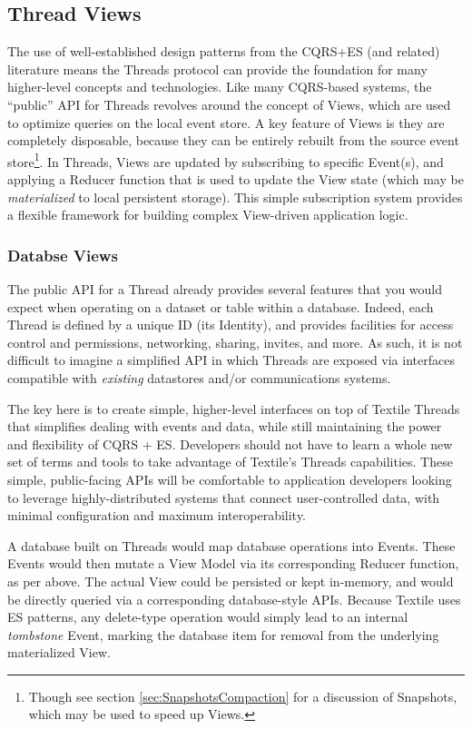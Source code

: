 \documentclass{textile}
\begin{document}
\subsection{Thread Views} \label{sec:threadviews}

The use of well-established design patterns from the CQRS+ES (and related) literature means the Threads protocol can provide the foundation for many higher-level concepts and technologies. Like many CQRS-based systems, the ``public'' API for Threads revolves around the concept of Views, which are used to optimize queries on the local event store. A key feature of Views is they are completely disposable, because they can be entirely rebuilt from the source event store\footnote{Though see section \ref{sec:SnapshotsCompaction} for a discussion of Snapshots, which may be used to speed up Views.}. In Threads, Views are updated by subscribing to specific Event(s), and applying a Reducer function that is used to update the View state (which may be \emph{materialized} to local persistent storage). This simple subscription system provides a flexible framework for building complex View-driven application logic.

\subsubsection{Databse Views}\label{sec:DefaultViews}

The public API for a Thread already provides several features that you would expect when operating on a dataset or table within a database. Indeed, each Thread is defined by a unique ID (its Identity), and provides facilities for access control and permissions, networking, sharing, invites, and more. As such, it is not difficult to imagine a simplified API in which Threads are exposed via interfaces compatible with \emph{existing} datastores and/or communications systems.

The key here is to create simple, higher-level interfaces on top of Textile Threads that simplifies dealing with events and data, while still maintaining the power and flexibility of CQRS + ES. Developers should not have to learn a whole new set of terms and tools to take advantage of Textile's Threads capabilities. These simple, public-facing APIs will be comfortable to application developers looking to leverage highly-distributed systems that connect user-controlled data, with minimal configuration and maximum interoperability.

A database built on Threads would map database operations into Events. These Events would then mutate a View Model via its corresponding Reducer function, as per above. The actual View could be persisted or kept in-memory, and would be directly queried via a corresponding database-style APIs. Because Textile uses ES patterns, any delete-type operation would simply lead to an internal \emph{tombstone} Event, marking the database item for removal from the underlying materialized View.
\end{document}
